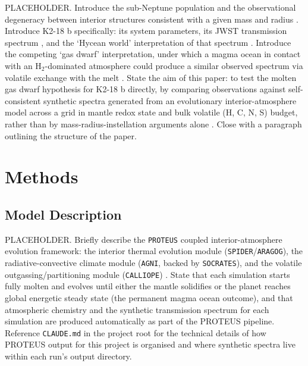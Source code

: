 \documentclass[fleqn,usenatbib]{mnras}
\begin{document}
PLACEHOLDER. Introduce the sub-Neptune population and the observational
degeneracy between interior structures consistent with a given mass and
radius \citep{Fulton2017,Rogers2023}. Introduce K2-18 b specifically: its
system parameters, its JWST transmission spectrum
\citep{Madhusudhan2023,Madhusudhan2025,Hu2025}, and the `Hycean world'
interpretation of that spectrum \citep{Madhusudhan2021,Madhusudhan2023}.
Introduce the competing `gas dwarf' interpretation, under which a magma ocean
in contact with an H$_2$-dominated atmosphere could produce a similar
observed spectrum via volatile exchange with the melt
\citep{Shorttle2024,Rigby2024,Wogan2024}. State the aim of this paper:
to test the molten gas dwarf hypothesis for K2-18 b directly, by comparing
observations against self-consistent synthetic spectra generated from an
evolutionary interior-atmosphere model across a grid in mantle redox state
and bulk volatile (H, C, N, S) budget, rather than by mass-radius-instellation
arguments alone \citep[cf.][]{Cloutier2017,Sarkis2018,Benneke2019}. Close with
a paragraph outlining the structure of the paper.

\section{Methods}
\label{sec:methods}

\subsection{Model Description}
\label{subsec:modeldescription}

PLACEHOLDER. Briefly describe the \texttt{PROTEUS} coupled
interior-atmosphere evolution framework: the interior thermal evolution
module (\texttt{SPIDER}/\texttt{ARAGOG}), the radiative-convective climate
module (\texttt{AGNI}, backed by \texttt{SOCRATES}), and the volatile
outgassing/partitioning module (\texttt{CALLIOPE})
\citep{Lichtenberg2021,Nicholls2024,Nicholls2025,Nicholls2025b,Bower2022}.
State that each simulation starts fully molten and evolves until either the
mantle solidifies or the planet reaches global energetic steady state (the
permanent magma ocean outcome), and that atmospheric chemistry and the
synthetic transmission spectrum for each simulation are produced automatically
as part of the PROTEUS pipeline. Reference \texttt{CLAUDE.md} in the project
root for the technical details of how PROTEUS output for this project is
organised and where synthetic spectra live within each run's output
directory.
\end{document}
